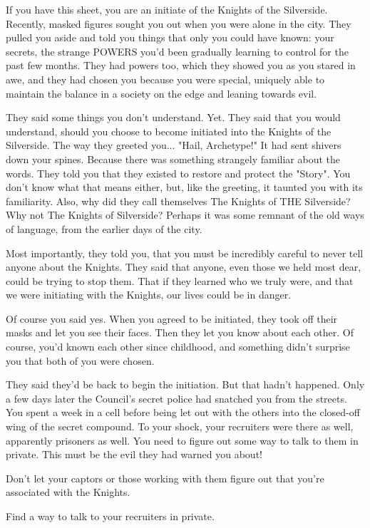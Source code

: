 \documentclass[blue]{Silversiders}
\begin{document}
\name{\bInitiates{}}

If you have this sheet, you are an initiate of the Knights of the Silverside. Recently, masked figures sought you out when you were alone in the city. They pulled you aside and told you things that only you could have known: your secrets, the strange POWERS you'd been gradually learning to control for the past few months. They had powers too, which they showed you as you stared in awe, and they had chosen you because you were special, uniquely able to maintain the balance in a society on the edge and leaning towards evil.

They said some things you don't understand. Yet. They said that you would understand, should you choose to become initiated into the Knights of the Silverside. The way they greeted you... "Hail, Archetype!" It had sent shivers down your spines. Because there was something strangely familiar about the words. They told you that they existed to restore and protect the "Story". You don't know what that means either, but, like the greeting, it taunted you with its familiarity. Also, why did they call themselves The Knights of THE Silverside? Why not The Knights of Silverside? Perhaps it was some remnant of the old ways of language, from the earlier days of the city.

Most importantly, they told you, that you must be incredibly careful to never tell anyone about the Knights. They said that anyone, even those we held most dear, could be trying to stop them. That if they learned who we truly were, and that we were initiating with the Knights, our lives could be in danger.

Of course you said yes. When you agreed to be initiated, they took off their masks and let you see their faces. Then they let you know about each other. Of course, you'd known each other since childhood, and something didn't surprise you that both of you were chosen.

They said they'd be back to begin the initiation. But that hadn't happened. Only a few days later the Council's secret police had snatched you from the streets. You spent a week in a cell before being let out with the others into the closed-off wing of the secret compound. To your shock, your recruiters were there as well, apparently prisoners as well. You need to figure out some way to talk to them in private. This must be the evil they had warned you about!

\begin{itemz}[Goals]
  \item Don't let your captors or those working with them figure out that you're associated with the Knights.
  \item Find a way to talk to your recruiters in private.
\end{itemz}
\end{document}
